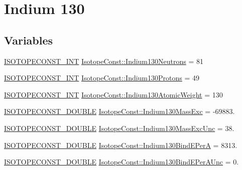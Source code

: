 \hypertarget{group___isotope_const-_indium-_in130}{}\section{Indium 130}
\label{group___isotope_const-_indium-_in130}
\subsection*{Variables}
\begin{DoxyCompactItemize}
\item 
\mbox{\hyperlink{group___isotope_const-_macros_ga5f18360b3e99483a35c32d789e62621c}{I\+S\+O\+T\+O\+P\+E\+C\+O\+N\+S\+T\+\_\+\+I\+NT}} \mbox{\hyperlink{group___isotope_const-_indium-_in130_gaeda16b436b3a54e23e7010c0f062b6ef}{Isotope\+Const\+::\+Indium130\+Neutrons}} = 81
\item 
\mbox{\hyperlink{group___isotope_const-_macros_ga5f18360b3e99483a35c32d789e62621c}{I\+S\+O\+T\+O\+P\+E\+C\+O\+N\+S\+T\+\_\+\+I\+NT}} \mbox{\hyperlink{group___isotope_const-_indium-_in130_ga06228358873b99e18f033061baa6ea8a}{Isotope\+Const\+::\+Indium130\+Protons}} = 49
\item 
\mbox{\hyperlink{group___isotope_const-_macros_ga5f18360b3e99483a35c32d789e62621c}{I\+S\+O\+T\+O\+P\+E\+C\+O\+N\+S\+T\+\_\+\+I\+NT}} \mbox{\hyperlink{group___isotope_const-_indium-_in130_ga09380dec37eb27d6da9c971836697b4b}{Isotope\+Const\+::\+Indium130\+Atomic\+Weight}} = 130
\item 
\mbox{\hyperlink{group___isotope_const-_macros_ga8f45a7272ce02c0b4c65c44636ed719a}{I\+S\+O\+T\+O\+P\+E\+C\+O\+N\+S\+T\+\_\+\+D\+O\+U\+B\+LE}} \mbox{\hyperlink{group___isotope_const-_indium-_in130_gab2e18e6484a006fc617373a7bcb777a6}{Isotope\+Const\+::\+Indium130\+Mass\+Exc}} = -\/69883.
\item 
\mbox{\hyperlink{group___isotope_const-_macros_ga8f45a7272ce02c0b4c65c44636ed719a}{I\+S\+O\+T\+O\+P\+E\+C\+O\+N\+S\+T\+\_\+\+D\+O\+U\+B\+LE}} \mbox{\hyperlink{group___isotope_const-_indium-_in130_ga210ea4cd61dcca1ab42acc8835e706b7}{Isotope\+Const\+::\+Indium130\+Mass\+Exc\+Unc}} = 38.
\item 
\mbox{\hyperlink{group___isotope_const-_macros_ga8f45a7272ce02c0b4c65c44636ed719a}{I\+S\+O\+T\+O\+P\+E\+C\+O\+N\+S\+T\+\_\+\+D\+O\+U\+B\+LE}} \mbox{\hyperlink{group___isotope_const-_indium-_in130_gaf9f53372b5d5f94ee5e1f0b3228eca4a}{Isotope\+Const\+::\+Indium130\+Bind\+E\+PerA}} = 8313.
\item 
\mbox{\hyperlink{group___isotope_const-_macros_ga8f45a7272ce02c0b4c65c44636ed719a}{I\+S\+O\+T\+O\+P\+E\+C\+O\+N\+S\+T\+\_\+\+D\+O\+U\+B\+LE}} \mbox{\hyperlink{group___isotope_const-_indium-_in130_ga5ad731e28eb5490277ddbfe7ad2d30c8}{Isotope\+Const\+::\+Indium130\+Bind\+E\+Per\+A\+Unc}} = 0.

\end{DoxyCompactItemize}
